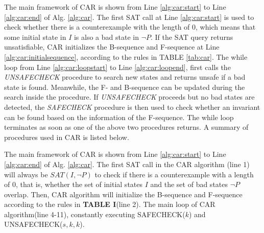 \iffalse
The CAR algorithm persistently generates new elements and then insert them into F-sequence or B-sequence through repeating calls to the SAT solver until either Safety Check or Unsafety check in TABLE I returns true. Obviously, the $Sys$ holds the property $P$ when Safety Check returns true, while a counterexample is found when UnSafety Check returns true. We will describe the CAR algorithm. followed by the heuristics of the restart policy. 

Here we demonstrate the top-level procedure of CAR algorithm, which is implemented in hundreds of lines of C++. The algorithm takes a system $Sys=(V,I,T)$ and a safety property $P$ as inputs, and the output will be safety when the algorithm finds an invariant to prove the $Sys$ satisfied $P$ or return unsafe when a counterexample is found. \textbf{The Text in red is related to restart policy, please ignore them temporarily}.
\fi 



The main framework of CAR is shown from Line \ref{alg:car:start} to Line \ref{alg:car:end} of Alg. \ref{alg:car}. The first SAT call at Line \ref{alg:car:start} is used to check whether there is a counterexample with the length of $0$, which means that some initial state in $I$ is also a bad state in $\neg P$. If the SAT query returns unsatisfiable, CAR initializes the B-sequence and F-sequence at Line \ref{alg:car:initialsequence}, according to the rules in TABLE \ref{tab:car}. The while loop from Line \ref{alg:car:loopstart} to Line \ref{alg:car:loopend}, first calls the \emph{UNSAFECHECK} procedure to search new states and returns unsafe if a bad state is found. Meanwhile, the F- and B-sequence can be updated during the search inside the procedure. If \emph{UNSAFECHECK} proceeds but no bad states are detected, the \emph{SAFECHECK} procedure is then used to check whether an invariant can be found based on the information of the F-sequence. The while loop terminates as soon as one of the above two procedures returns. A summary of procedures used in CAR is listed below.

\iffalse
The main framework of CAR is shown from Line \ref{alg:car:start} to Line \ref{alg:car:end} of Alg. \ref{alg:car}. The first SAT call in the CAR algorithm (line 1) will always be $\mathit{SAT}(I,\neg P)$ to check if there is a counterexample with a length of $0$, that is, whether the set of initial states $I$ and the set of bad states $\neg P$ overlap. Then, CAR algorithm will initialize the B-sequence and F-sequence according to the rules in \textbf{TABLE I}(line 2). The main loop of CAR algorithm(line 4-11), constantly executing SAFECHECK($k$) and UNSAFECHECK($s,k,k$). 



